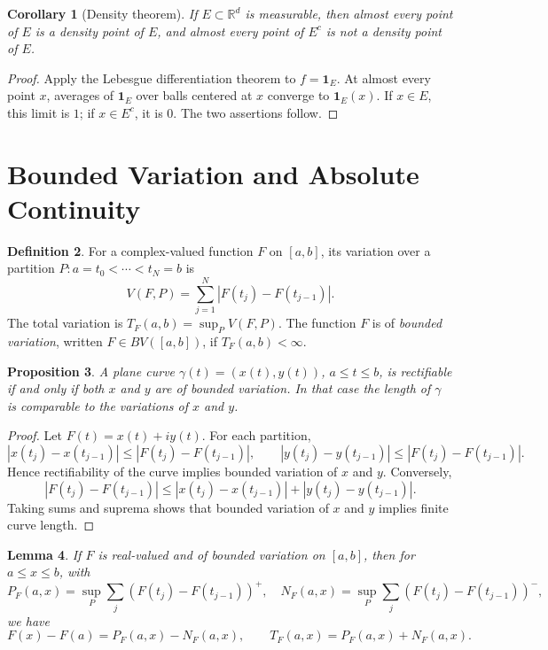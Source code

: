\documentclass[11pt,openany]{book}
\numberwithin{equation}{chapter}
\theoremstyle{definition}
\newtheorem{definition}{Definition}[chapter]
\theoremstyle{plain}
\newtheorem{proposition}[definition]{Proposition}
\newtheorem{lemma}[definition]{Lemma}
\newtheorem{corollary}[definition]{Corollary}
\theoremstyle{remark}
\newcommand{\R}{\mathbb{R}}
\newcommand{\1}{\mathbf{1}}
\newcommand{\abs}[1]{\left\lvert #1\right\rvert}
\begin{document}
\begin{corollary}[Density theorem]
If \(E\subset\R^d\) is measurable, then almost every point of \(E\) is a density point of \(E\), and almost every point of \(E^c\) is not a density point of \(E\).
\end{corollary}

\begin{proof}
Apply the Lebesgue differentiation theorem to \(f=\1_E\).  At almost every point \(x\), averages of \(\1_E\) over balls centered at \(x\) converge to \(\1_E(x)\).  If \(x\in E\), this limit is \(1\); if \(x\in E^c\), it is \(0\).  The two assertions follow.
\end{proof}

\section{Bounded Variation and Absolute Continuity}

\begin{definition}
For a complex-valued function \(F\) on \([a,b]\), its variation over a partition \(P:a=t_0<\cdots<t_N=b\) is
\[
    V(F,P)=\sum_{j=1}^N\abs{F(t_j)-F(t_{j-1})}.
\]
The total variation is \(T_F(a,b)=\sup_PV(F,P)\).  The function \(F\) is of \emph{bounded variation}, written \(F\in BV([a,b])\), if \(T_F(a,b)<\infty\).
\end{definition}

\begin{proposition}
A plane curve \(\gamma(t)=(x(t),y(t))\), \(a\le t\le b\), is rectifiable if and only if both \(x\) and \(y\) are of bounded variation.  In that case the length of \(\gamma\) is comparable to the variations of \(x\) and \(y\).
\end{proposition}

\begin{proof}
Let \(F(t)=x(t)+iy(t)\).  For each partition,
\[
    \abs{x(t_j)-x(t_{j-1})}\le\abs{F(t_j)-F(t_{j-1})},\qquad
    \abs{y(t_j)-y(t_{j-1})}\le\abs{F(t_j)-F(t_{j-1})}.
\]
Hence rectifiability of the curve implies bounded variation of \(x\) and \(y\).  Conversely,
\[
    \abs{F(t_j)-F(t_{j-1})}
    \le \abs{x(t_j)-x(t_{j-1})}+\abs{y(t_j)-y(t_{j-1})}.
\]
Taking sums and suprema shows that bounded variation of \(x\) and \(y\) implies finite curve length.
\end{proof}

\begin{lemma}
If \(F\) is real-valued and of bounded variation on \([a,b]\), then for \(a\le x\le b\), with
\[
    P_F(a,x)=\sup_P\sum_j (F(t_j)-F(t_{j-1}))^+,
    \quad
    N_F(a,x)=\sup_P\sum_j (F(t_j)-F(t_{j-1}))^-,
\]
we have
\[
    F(x)-F(a)=P_F(a,x)-N_F(a,x),
    \qquad
    T_F(a,x)=P_F(a,x)+N_F(a,x).
\]
\end{lemma}
\end{document}
